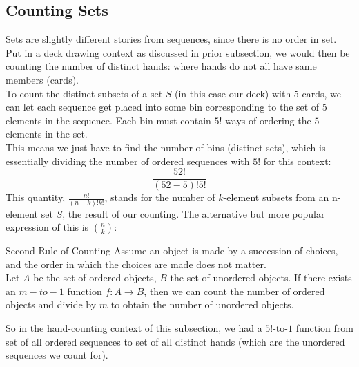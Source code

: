 \subsection{Counting Sets}
Sets are slightly different stories from sequences, since there is no order in set. \\
Put in a deck drawing context as discussed in prior subsection, we would then be counting the number of distinct hands: where hands do not all have same members (cards). \\
To count the distinct subsets of a set $S$ (in this case our deck) with $5$ cards, we can let each sequence get placed into some bin corresponding to the set of 5 elements in the sequence. Each bin must contain $5!$ ways of ordering the $5$ elements in the set. \\
This means we just have to find the number of bins (distinct sets), which is essentially dividing the number of ordered sequences with $5!$ for this context:
\[\frac{52!}{(52 - 5)!5!}\]
This quantity, $\frac{n!}{(n - k)!k!}$, stands for the number of $k$-element subsets from an n-element set $S$, the result of our counting. The alternative but more popular expression of this is $\binom{n}{k}$:
\begin{ln-theorem}{Second Rule of Counting}{}
    Assume an object is made by a succession of choices, and the order in which the choices are made does not matter. \\
    Let $A$ be the set of ordered objects, $B$ the set of unordered objects. If there exists an $m-to-1$ function $f: A \rightarrow B$, then we can count the number of ordered objects and divide by $m$ to obtain the number of unordered objects.
\end{ln-theorem}
So in the hand-counting context of this subsection, we had a $5!$-to-$1$ function from set of all ordered sequences to set of all distinct hands (which are the unordered sequences we count for).

